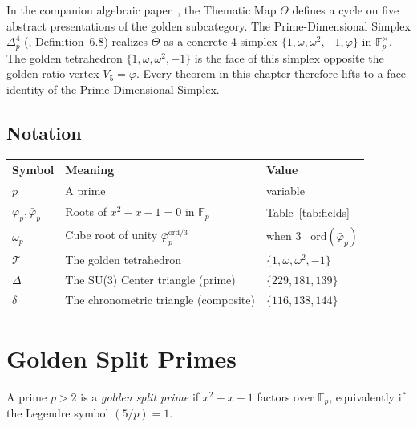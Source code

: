 In the companion algebraic paper~\cite{larue_lc}, the Thematic Map
$\Theta$ defines a cycle on five abstract presentations of the golden
subcategory. The Prime-Dimensional Simplex $\Delta^4_p$
(\cite{larue_lc}, Definition~6.8) realizes $\Theta$ as a concrete
4-simplex $\{1, \omega, \omega^2, -1, \varphi\}$ in $\mathbb{F}_p^\times$.
The golden tetrahedron $\{1, \omega, \omega^2, -1\}$ is the face of
this simplex opposite the golden ratio vertex $V_5 = \varphi$. Every
theorem in this chapter therefore lifts to a face identity of the
Prime-Dimensional Simplex.

\subsection{Notation}

\begin{center}
\begin{tabular}{@{}lll@{}}
\toprule
Symbol & Meaning & Value \\
\midrule
$p$ & A prime & variable \\
$\varphi_p, \bar\varphi_p$ & Roots of $x^2 - x - 1 = 0$ in $\mathbb{F}_p$ & Table~\ref{tab:fields} \\
$\omega_p$ & Cube root of unity $\bar\varphi_p^{\mathrm{ord}/3}$ & when $3 \mid \mathrm{ord}(\bar\varphi_p)$ \\
$\mathcal{T}$ & The golden tetrahedron & $\{1, \omega, \omega^2, -1\}$ \\
$\Delta$ & The SU(3) Center triangle (prime) & $\{229, 181, 139\}$ \\
$\delta$ & The chronometric triangle (composite) & $\{116, 138, 144\}$ \\
\bottomrule
\end{tabular}
\end{center}

\section{Golden Split Primes}
\label{sec:golden}

\begin{definition}
\label{def:golden}
A prime $p > 2$ is a \emph{golden split prime} if $x^2 - x - 1$
factors over $\mathbb{F}_p$, equivalently if the Legendre symbol
$(5/p) = 1$.
\end{definition}

